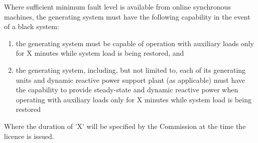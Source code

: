Where sufficient minimum fault level is available from online synchronous machines, the generating system must have the following capability in the event of a black system:

\begin{enumerate}[label=(\alph*)]
	\item the generating system must be capable of operation with auxiliary loads only for X minutes while system load is being restored, and  
	\item the generating system, including, but not limited to, each of its generating units and dynamic reactive power support plant (as applicable) must have the capability to provide steady-state and dynamic reactive power when operating with auxiliary loads only for X minutes while system load is being restored  
\end{enumerate}

Where the duration of 'X' will be specified by the Commission at the time the licence is issued.
